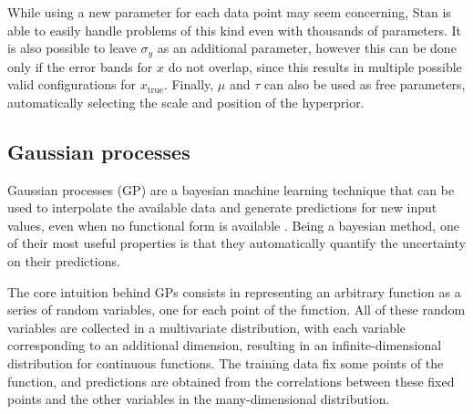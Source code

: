 While using a new parameter for each data point may seem concerning, Stan is able to easily handle problems of this kind even with thousands of parameters. 
It is also possible to leave $\sigma_y$ as an additional parameter, however this can be done only if the error bands for \(x\) do not overlap, since this results in multiple possible valid configurations for \(x_{\text{true}}\). Finally, $\mu$ and $\tau$ can also be used as free parameters, automatically selecting the scale and position of the hyperprior.




\subsection{Gaussian processes}
Gaussian processes (GP) are a bayesian machine learning technique that can be used to interpolate the available data
and generate predictions for new input values, even when no functional form is available \cite{mackay1998introduction}.
Being a bayesian method, one of their most useful properties is that they automatically quantify the uncertainty on their predictions.

The core intuition behind GPs consists in representing an arbitrary function as a series of random variables, one for
each point of the function. All of these random variables are collected in a multivariate distribution, with each variable
corresponding to an additional dimension, resulting in an infinite-dimensional distribution for continuous functions. The training data fix some points of the function, and predictions are
obtained from the correlations between these fixed points and the other variables in the many-dimensional distribution.


